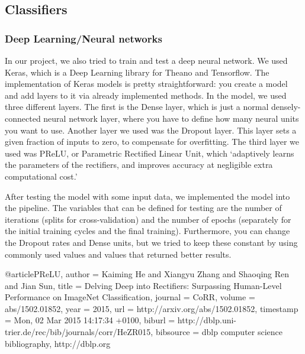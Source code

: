 \subsection{Classifiers}

\subsubsection{Deep Learning/Neural networks}

In our project, we also tried to train and test a deep neural network. We used Keras, which is a Deep Learning library for Theano and Tensorflow. The implementation of Keras models is pretty straightforward: you create a model and add layers to it via already implemented methods. In the model, we used three different layers. The first is the Dense layer, which is just a normal densely-connected neural network layer, where you have to define how many neural units you want to use. Another layer we used was the Dropout layer. This layer sets a given fraction of inputs to zero, to compensate for overfitting. The third layer we used was PReLU, or Parametric Rectified Linear Unit, which `adaptively learns the parameters of the rectifiers, and improves accuracy at negligible extra computational cost.' \cite{PReLU}

After testing the model with some input data, we implemented the model into the pipeline. The variables that can be defined for testing are the number of iterations (splits for cross-validation) and the number of epochs (separately for the initial training cycles and the final training). Furthermore, you can change the Dropout rates and Dense units, but we tried to keep these constant by using commonly used values and values that returned better results.

{}


\begin{thebibliography}{9}

@article{PReLU,
  author    = {Kaiming He and
               Xiangyu Zhang and
               Shaoqing Ren and
               Jian Sun},
  title     = {Delving Deep into Rectifiers: Surpassing Human-Level Performance on
               ImageNet Classification},
  journal   = {CoRR},
  volume    = {abs/1502.01852},
  year      = {2015},
  url       = {http://arxiv.org/abs/1502.01852},
  timestamp = {Mon, 02 Mar 2015 14:17:34 +0100},
  biburl    = {http://dblp.uni-trier.de/rec/bib/journals/corr/HeZR015},
  bibsource = {dblp computer science bibliography, http://dblp.org}
}

\end{thebibliography}


